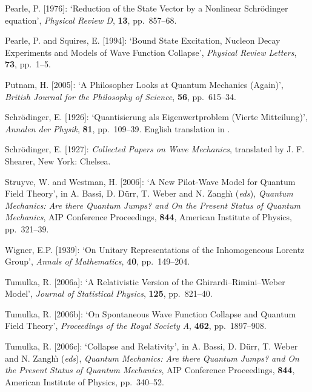 \documentclass[12pt]{article}
\begin{document}
\begin{thebibliography}{29}
  Pearle, P. [1976]: `Reduction of the State Vector by a 
   Nonlinear Schr\"odinger equation', \textit{Physical Review D}, \textbf{13},  
   pp.~857--68.

 Pearle, P. and Squires, E. [1994]: `Bound State Excitation, Nucleon 
   Decay Experiments and Models of Wave Function Collapse',
   \textit{Physical Review Letters}, \textbf{73}, pp.~1--5.
   
 Putnam, H. [2005]:
	`A Philosopher Looks at Quantum Mechanics (Again)',
   \textit{British Journal for the Philosophy of Science}, \textbf{56}, pp.~615--34.

Schr\"odinger, E. [1926]: `Quantisierung als Eigenwertproblem (Vierte Mitteilung)',
\textit{Annalen der Physik}, \textbf{81}, pp.~109--39.  English translation in \citep{sch}.

 Schr\"odinger, E. [1927]: \textit{Collected Papers on Wave Mechanics}, translated by J. F. Shearer, New York: Chelsea.

 Struyve, W. and Westman, H. [2006]:
  `A New Pilot-Wave Model for Quantum Field Theory',
  in A. Bassi, D. D\"urr, T. Weber and N. Zangh{\`{\i}} (\textit{eds}),
  \textit{Quantum Mechanics: Are there Quantum Jumps? and
  On the Present Status of Quantum Mechanics},
  AIP Conference Proceedings, \textbf{844},
  American Institute of Physics,  pp.~321--39.

 Wigner, E.P. [1939]: `On Unitary Representations of the Inhomogeneous Lorentz Group', \textit{Annals of Mathematics}, {\bf 40},
pp.~149--204.

 Tumulka, R. [2006a]: `A Relativistic Version of the
  Ghirardi--Rimini--Weber Model',
  \textit{Journal of Statistical Physics}, \textbf{125}, pp.~821--40.

 Tumulka, R. [2006b]: `On Spontaneous Wave Function
	Collapse and Quantum Field Theory',
	\textit{Proceedings of the Royal Society A},
	\textbf{462}, pp.~1897--908.
	
 Tumulka, R. [2006c]:
  `Collapse and Relativity', in A.
  Bassi, D. D\"urr, T. Weber and N. Zangh{\`{\i}} (\textit{eds}),
  \textit{Quantum Mechanics: Are there Quantum Jumps? and
  On the Present Status of Quantum Mechanics},
  AIP Conference Proceedings, \textbf{844}, 
  American Institute of Physics, pp.~340--52.

\end{thebibliography}
\end{document}
